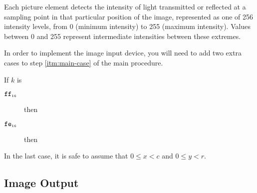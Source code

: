 \documentclass[a4paper,12pt]{article}
\newcommand{\num}[1]{\texttt{\MakeLowercase{#1}}}
\newcommand{\hex}[1]{\num{#1}_{\textup{\tiny 16}}}
\newcommand{\proc}[1]{\textsc{#1}}
\newcommand{\deviceio}[1]{$\langle$#1$\rangle$}
\newcommand{\op}[1]{$#1$}
\theoremstyle{definition}
\newcommand{\READPIXEL} [1]{\op{\hex{FE}}}
\newcommand{\READFRAME} [1]{\op{\hex{FF}}}
\begin{document}
Each picture element detects the intensity of light transmitted or reflected at a sampling point in that particular position of the image, represented as one of 256 intensity levels, from 0 (minimum intensity) to 255 (maximum intensity).
Values between 0 and 255 represent intermediate intensities between these extremes.

In order to implement the image input device, you will need to add two extra cases to step \ref{itm:main-case} of the main procedure.

\begin{stepnumbers}[start=3]
\item If $k$ is
  \begin{description}
  \item[\READFRAME{}] then
  \item[\READPIXEL{}] then
  \end{description}
\end{stepnumbers}
In the last case, it is safe to assume that $0 \le x < c$ and $0 \le y < r$.

\subsection{Image Output}
\end{document}

